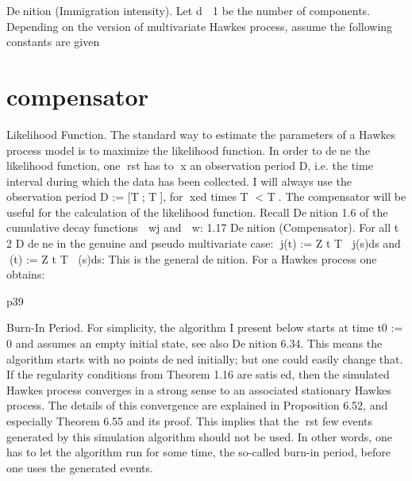\documentclass[11pt]{book}
\begin{document}
Denition (Immigration intensity). Let d  1 be the number of components.
Depending on the version of multivariate Hawkes process, assume the
following constants are given

\section{compensator}
Likelihood Function. The standard way to estimate the parameters of a
Hawkes process model is to maximize the likelihood function. In order to
dene the likelihood function, one rst has to x an observation period D, i.e.
the time interval during which the data has been collected. I will always use
the observation period D := [T; T], for xed times T < T.
The compensator will be useful for the calculation of the likelihood function.
Recall Denition 1.6 of the cumulative decay functions  wj and  w:
1.17 Denition (Compensator). For all t 2 D dene in the genuine and
pseudo multivariate case:
j(t) :=
Z t
T
j(s)ds and (t) :=
Z t
T
(s)ds:
This is the general denition. For a Hawkes process one obtains:

p39


Burn-In Period. For simplicity, the algorithm I present below starts at time
t0 := 0 and assumes an empty initial state, see also Denition 6.34. This
means the algorithm starts with no points dened initially; but one could easily
change that. If the regularity conditions from Theorem 1.16 are satised, then
the simulated Hawkes process converges in a strong sense to an associated
stationary Hawkes process. The details of this convergence are explained in
Proposition 6.52, and especially Theorem 6.55 and its proof.
This implies that the rst few events generated by this simulation algorithm
should not be used. In other words, one has to let the algorithm run for some
time, the so-called burn-in period, before one uses the generated events.



\cleardoublepage%
\appendix
\pagestyle{back}





\backmatter
\end{document}
